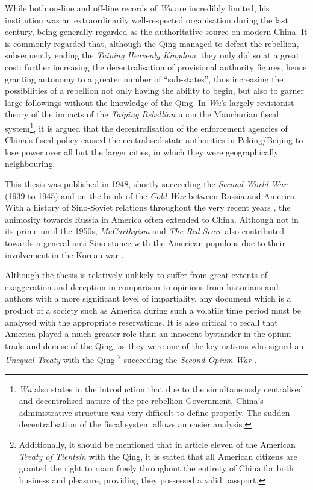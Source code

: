 \documentclass{article}
\begin{document}
        While both on-line and off-line records of \textit{Wu} are incredibly limited, his institution was an extraordinarily well-respected organisation during the last century, being generally regarded as the authoritative source on modern China. It is commonly regarded that, although the Qing managed to defeat the rebellion, subsequently ending the \textit{Taiping Heavenly Kingdom}, they only did so at a great cost: further increasing the decentralisation of provisional authority figures, hence granting autonomy to a greater number of ``sub-states'', thus increasing the possibilities of a rebellion not only having the ability to begin, but also to garner large followings without the knowledge of the Qing. In \textit{Wu}'s largely-revisionist theory of the impacts of the \textit{Taiping Rebellion} upon the Manchurian fiscal system\footnote{\textit{Wu} also states in the introduction that due to the simultaneously centralised and decentralised nature of the pre-rebellion Government, China's administrative structure was very difficult to define properly. The sudden decentralisation of the fiscal system allows an easier analysis.}, it is argued that the decentralisation of the enforcement agencies of China's fiscal policy caused the centralised state authorities in Peking/Beijing to lose power over all but the larger cities, in which they were geographically neighbouring.

        This thesis was published in 1948, shortly succeeding the \textit{Second World War} (1939 to 1945) and on the brink of the \textit{Cold War} between Russia and America. With a history of Sino-Soviet relations throughout the very recent years \autocite{Garver:1989}, the animosity towards Russia in America often extended to China. Although not in its prime until the 1950s, \textit{McCarthyism} and \textit{The Red Scare} also contributed towards a general anti-Sino stance with the American populous due to their involvement in the Korean war \autocite{Schrecker:1998}.

        Although the thesis is relatively unlikely to suffer from great extents of exaggeration and deception in comparison to opinions from historians and authors with a more significant level of impartiality, any document which is a product of a society such as America during such a volatile time period must be analysed with the appropriate reservations. It is also critical to recall that America played a much greater role than an innocent bystander in the opium trade and demise of the Qing, as they were one of the key nations who signed an \textit{Unequal Treaty} with the Qing \autocite{Peters:1961}\footnote{Additionally, it should be mentioned that in article eleven of the American \textit{Treaty of Tientsin} with the Qing, it is stated that all American citizens are granted the right to roam freely throughout the entirety of China for both business and pleasure, providing they possessed a valid passport.} succeeding the \textit{Second Opium War} \autocite{Johnstone:1937}.

\pagebreak
\printbibliography[title={Cited Works}, heading=bibintoc]
\end{document}
